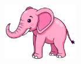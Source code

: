 \begin{center}
    \begin{figure}[H]
        \centering
        \includegraphics[height=70pt]{pink_elephant.png}
        \label{fig:pink_elephant}
        \vspace{-3em}
    \end{figure}
\end{center}
